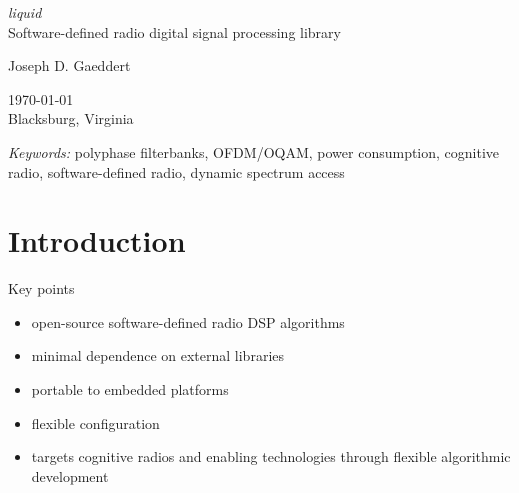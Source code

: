 \documentclass[11pt,twoside]{report}
\begin{document}



%
%
\thispagestyle{empty}
\begin{center}

{\huge\it liquid} \\
Software-defined radio digital signal processing library

\vfill

Joseph D. Gaeddert

\vfill

\today \\
Blacksburg, Virginia

\vfill

{\it Keywords:}
polyphase filterbanks,
OFDM/OQAM,
power consumption,
cognitive radio,
software-defined radio,
dynamic spectrum access
\\

\end{center}

\pagebreak
%
%
\tableofcontents
\pagebreak





%
%

\section{Introduction}
Key points
\begin{itemize}
\item open-source software-defined radio DSP algorithms
\item minimal dependence on external libraries
\item portable to embedded platforms
\item flexible configuration
\item targets cognitive radios and enabling technologies through
      flexible algorithmic development
\end{itemize}
\end{document}
